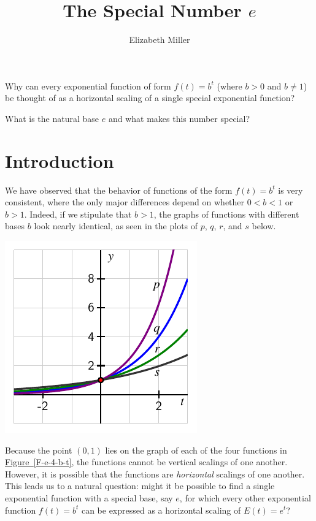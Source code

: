 \documentclass[nooutcomes]{ximera}
\author{Elizabeth Miller}
\title{The Special Number $e$}
\begin{document}
\begin{abstract}
  
\end{abstract}
\maketitle



\begin{motivatingQuestions}
\item Why can every exponential function of form \(f(t) = b^t\) (where \(b \gt 0\) and \(b \ne 1\)) be thought of as a horizontal scaling of a single special exponential function?
\item What is the natural base \(e\) and what makes this number special?
\end{motivatingQuestions}



\section{Introduction}
We have observed that the behavior of functions of the form \(f(t) = b^t\) is very consistent, where the only major differences depend on whether \(0< b < 1\) or \(b > 1\).  Indeed, if we stipulate that \(b \gt 1\), the graphs of functions with different bases \(b\) look nearly identical, as seen in the plots of \(p\), \(q\), \(r\), and \(s\) below.

\begin{image}
\includegraphics{e-base-compression}
\end{image}
Because the point \((0,1)\) lies on the graph of each of the four functions in \hyperref[F-e-4-b-t]{Figure~\ref{F-e-4-b-t}}, the functions cannot be vertical scalings of one another.  However, it is possible that the functions are \emph{horizontal} scalings of one another.  This leads us to a natural question:  might it be possible to find a single exponential function with a special base, say \(e\), for which every other exponential function \(f(t) = b^t\) can be expressed as a horizontal scaling of \(E(t) = e^t\)?
\end{document}
